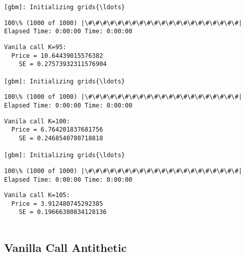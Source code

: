 \documentclass[11pt]{article}
\begin{document}
    \begin{Verbatim}[commandchars=\\\{\}]
[gbm]: Initializing grids{\ldots}

    \end{Verbatim}

    \begin{Verbatim}[commandchars=\\\{\}]
100\% (1000 of 1000) |\#\#\#\#\#\#\#\#\#\#\#\#\#\#\#\#\#\#\#\#\#| Elapsed Time: 0:00:00 Time: 0:00:00

    \end{Verbatim}

    \begin{Verbatim}[commandchars=\\\{\}]
Vanila call K=95:
  Price = 10.64439015576382
    SE = 0.27573932311576904

[gbm]: Initializing grids{\ldots}

    \end{Verbatim}

    \begin{Verbatim}[commandchars=\\\{\}]
100\% (1000 of 1000) |\#\#\#\#\#\#\#\#\#\#\#\#\#\#\#\#\#\#\#\#\#| Elapsed Time: 0:00:00 Time: 0:00:00

    \end{Verbatim}

    \begin{Verbatim}[commandchars=\\\{\}]
Vanila call K=100:
  Price = 6.764201837681756
    SE = 0.2468540780718818

[gbm]: Initializing grids{\ldots}

    \end{Verbatim}

    \begin{Verbatim}[commandchars=\\\{\}]
100\% (1000 of 1000) |\#\#\#\#\#\#\#\#\#\#\#\#\#\#\#\#\#\#\#\#\#| Elapsed Time: 0:00:00 Time: 0:00:00

    \end{Verbatim}

    \begin{Verbatim}[commandchars=\\\{\}]
Vanila call K=105:
  Price = 3.912480745292385
    SE = 0.19666380834128136


    \end{Verbatim}

    \subsection{Vanilla Call Antithetic}\label{vanilla-call-antithetic}
\end{document}
